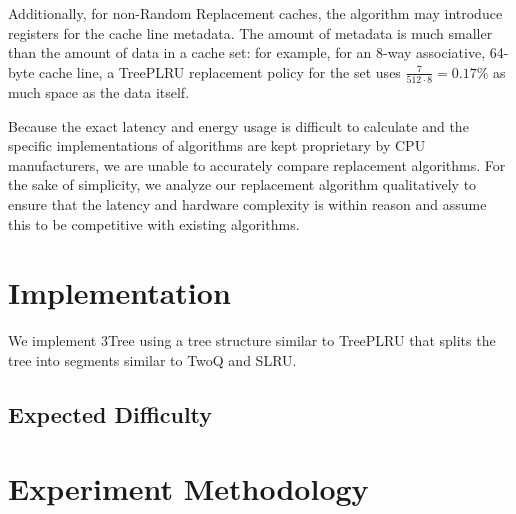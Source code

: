 \documentclass[sigconf, screen, review]{acmart}
\begin{document}
Additionally, for non-Random Replacement caches, the algorithm may introduce registers
for the cache line metadata.
The amount of metadata is much smaller than the amount of data in a cache set:
for example, for an 8-way associative, 64-byte cache line,
a TreePLRU replacement policy for the set uses
$\frac{7}{512 \cdot 8}=0.17\%$ as much space as the data itself.

Because the exact latency and energy usage is difficult to calculate
and the specific implementations of algorithms are kept proprietary by CPU manufacturers,
we are unable to accurately compare replacement algorithms.
For the sake of simplicity,
we analyze our replacement algorithm qualitatively to ensure that the latency and hardware complexity
is within reason and assume this to be competitive with existing algorithms.

\section{Implementation}

We implement 3Tree using a tree structure similar to TreePLRU
that splits the tree into segments similar to TwoQ and SLRU.

\begin{algorithmic}
\end{algorithmic}


\subsection{Expected Difficulty}

\section{Experiment Methodology}
\end{document}
